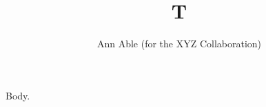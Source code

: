 \documentclass{elsarticle}
\begin{document}
\begin{frontmatter}
\title{T}
\author{Ann Able (for the XYZ Collaboration)}
\address{Univ X}
\end{frontmatter}
Body.
\end{document}
